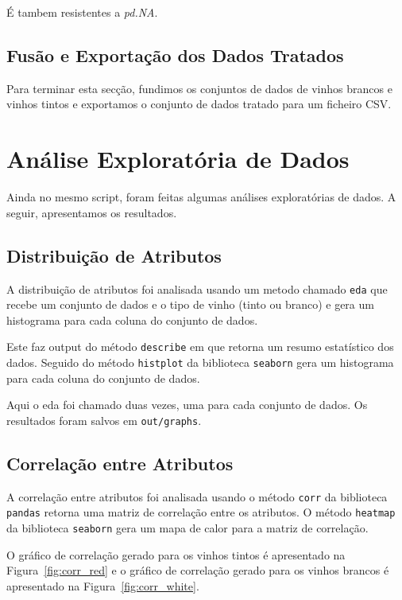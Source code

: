 \documentclass{article}
\begin{document}
    É tambem resistentes a \textit{pd.NA}.

    \subsection{Fusão e Exportação dos Dados Tratados}
    Para terminar esta secção, fundimos os conjuntos de dados de vinhos brancos e vinhos tintos e exportamos o conjunto de dados tratado para um ficheiro CSV.


    \section{Análise Exploratória de Dados}

    Ainda no mesmo script, foram feitas algumas análises exploratórias de dados. A seguir, apresentamos os resultados.

    \subsection{Distribuição de Atributos}
    A distribuição de atributos foi analisada usando um metodo chamado \texttt{eda} que recebe um conjunto de dados e o tipo de vinho (tinto ou branco) e gera um histograma para cada coluna do conjunto de dados.

    Este faz output do método \texttt{describe} em que retorna um resumo estatístico dos dados. Seguido do método \texttt{histplot} da biblioteca \texttt{seaborn} gera um histograma para cada coluna do conjunto de dados.

    Aqui o eda foi chamado duas vezes, uma para cada conjunto de dados. Os resultados foram salvos em \texttt{out/graphs}.

    \subsection{Correlação entre Atributos}
    A correlação entre atributos foi analisada usando o método \texttt{corr} da biblioteca \texttt{pandas} retorna uma matriz de correlação entre os atributos. O método \texttt{heatmap} da biblioteca \texttt{seaborn} gera um mapa de calor para a matriz de correlação.

    O gráfico de correlação gerado para os vinhos tintos é apresentado na Figura~\ref{fig:corr_red} e o gráfico de correlação gerado para os vinhos brancos é apresentado na Figura~\ref{fig:corr_white}.
\end{document}
